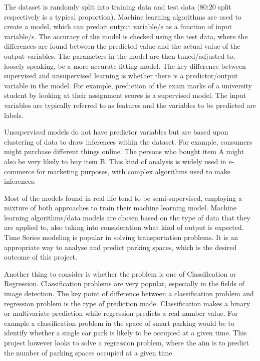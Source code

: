 The dataset is randomly split into training data and test data (80:20 split respectively is a typical proportion). Machine learning algorithms are used to create a model, which can predict output variable/s as a function of input variable/s. The accuracy of the model is checked using the test data, where the differences are found between the predicted value and the actual value of the output variables. The parameters in the model are then tuned/adjusted to, loosely speaking, be a more accurate fitting model. The key difference between supervised and unsupervised learning is whether there is a predictor/output variable in the model. For example, prediction of the exam marks of a university student by looking at their assignment scores is a supervised model. The input variables are typically referred to as features and the variables to be predicted are labels. 

 Unsupervised models do not have predictor variables but are based upon clustering of data to draw inferences within the dataset. For example, consumers might purchase different things online. The persons who bought item A might also be very likely to buy item B. This kind of analysis is widely used in e-commerce for marketing purposes, with complex algorithms used to make inferences. 

Most of the models found in real life tend to be semi-supervised, employing a mixture of both approaches to train their machine learning model. Machine learning algorithms/data models are chosen based on the type of data that they are applied to, also taking into consideration what kind of output is expected. Time Series modeling is popular in solving transportation problems. It is an appropriate way to analyse and predict parking spaces, which is the desired outcome of this project.   

Another thing to consider is whether the problem is one of Classification or Regression. Classification problems are very popular, especially in the fields of image detection. The key point of difference between a classification  problem and regression problem is the type of prediction made. Classification makes a binary or multivariate prediction while regression predicts a real number value.  For example a classification problem in the space of smart parking would be to identify whether a single car park is likely to be occupied at a given time. This project however looks to solve a regression problem, where the aim is to predict the number of parking spaces occupied at a given time.  

